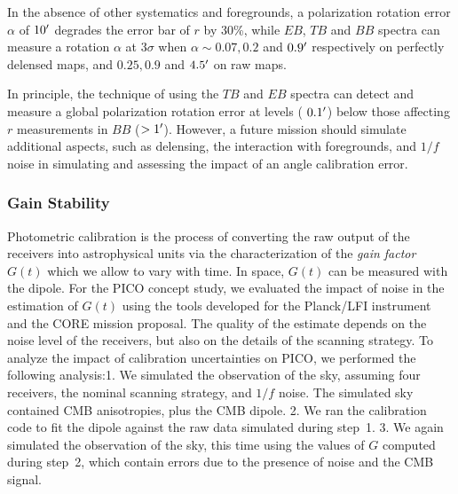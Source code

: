 \documentclass[PICOReport.tex]{subfiles}
\begin{document}
In the absence of other systematics and foregrounds, a polarization rotation error $\alpha$ of $10'$ degrades 
the error bar of $r$ by 30\%, while $EB$, $TB$ and $BB$ spectra can measure a rotation $\alpha$ at 3$\sigma$ when $\alpha \sim 0.07, 0.2$  and $0.9'$ respectively
 on perfectly delensed maps, and $0.25, 0.9$ and $4.5'$ on raw maps.

In principle, the technique of using the $TB$ and $EB$ spectra can detect and measure a global polarization rotation error at levels ($~0.1 '$) below those affecting $r$ measurements in $BB$ ($> 1 '$).  However, a future mission should simulate additional aspects, such as delensing, the interaction with foregrounds, and $1/f$ noise in simulating and assessing the impact of an angle calibration error.

\subsubsection{Gain Stability}
\label{sec:gain}



Photometric calibration is the process of converting the raw output of the receivers into astrophysical units via the characterization of the \emph{gain factor} $G(t)$ which we allow to vary with time.  In space, $G(t)$ can be measured with the dipole.   For the PICO concept study, we evaluated the impact of noise in the estimation of $G(t)$ using the tools developed for the Planck/LFI instrument and the CORE mission proposal. The quality of the estimate depends on the noise level of the receivers, but also on the details of the scanning strategy. 
To analyze the impact of calibration uncertainties on PICO, we performed  the following analysis:1. We simulated the observation of the sky, assuming four receivers, the nominal scanning strategy, and $1/f$ noise. The simulated sky contained CMB anisotropies, plus the CMB dipole. 2. We ran the calibration code to fit the dipole against the raw data simulated during step~1. 3. We again simulated the observation of the sky, this time using the values of $G$ computed during step~2, which contain errors due to the presence of noise and the CMB signal.
\end{document}
